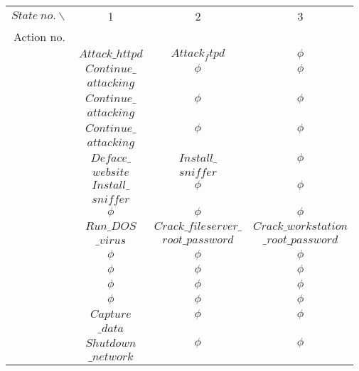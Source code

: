 \documentclass{acm_proc_article-sp}
\begin{document}
\newcommand{\Rownb}{\stepcounter{Rownumberb}\theRownumberb}
\begin{table}[htbp]
\scriptsize
\centering
\begin{tabular}{cccc}\hline
$State~no.\backslash$  &  1      &  2       & 3         \\
Action no.             &         &          &           \\\hline
\Rownb                 & $Attack\_httpd$  &  $Attack_ftpd$     &   $\phi$\\
\Rownb                 & $Continue\_$  &  $\phi$     &   $\phi$\\
                       & $attacking$  &  &  \\
\Rownb                 & $Continue\_$  &  $\phi$     &   $\phi$\\
                       & $attacking$   &  &  \\
\Rownb                 & $Continue\_$  &  $\phi$     &   $\phi$\\
                       & $attacking$   &  &  \\
\Rownb                 & $Deface\_$  &  $Install\_$     &   $\phi$\\
                       & $website$   & $sniffer$  &  \\
\Rownb                 & $Install\_$  &  $\phi$     &   $\phi$\\
                       & $sniffer$  &  &  \\
\Rownb                 & $\phi$  &  $\phi$  & $\phi$    \\
\Rownb                & $Run\_DOS$  &  $Crack\_fileserver\_$ &   $Crack\_workstation$\\
                       & $\_virus$ & $ root\_password$& $\_root\_password $\\
\Rownb                 & $\phi$  &  $\phi$  & $\phi$    \\
\Rownb                 & $\phi$  &  $\phi$  & $\phi$    \\
\Rownb                 & $\phi$  &  $\phi$  & $\phi$    \\
\Rownb                 & $\phi$  &  $\phi$  & $\phi$    \\
\Rownb                 & $Capture$  &  $\phi$  & $\phi$    \\
                       & $\_data$ &  &  \\
\Rownb                 & $Shutdown$  &  $\phi$  & $\phi$    \\
                       & $\_network$ &  &  \\

\end{tabular}
\end{table}
\end{document}
